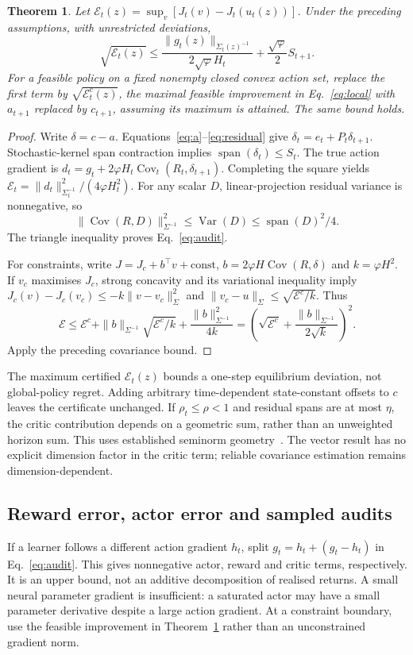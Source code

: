 \documentclass[sigconf,anonymous,review]{acmart}
\newcommand{\Var}{\operatorname{Var}}
\newcommand{\Cov}{\operatorname{Cov}}
\newcommand{\spn}{\operatorname{span}}
\newtheorem{theorem}{Theorem}
\begin{document}
\begin{theorem}\label{th:audit}
Let $\mathcal E_t(z)=\sup_v[J_t(v)-J_t(u_t(z))]$. Under the preceding assumptions, with unrestricted deviations,
\begin{equation}\label{eq:audit}
 \sqrt{\mathcal E_t(z)}\le
 \frac{\|g_t(z)\|_{\Sigma_t(z)^{-1}}}{2\sqrt\varphi H_t}
 +\frac{\sqrt\varphi}{2}S_{t+1}.
\end{equation}
For a feasible policy on a fixed nonempty closed convex action set, replace the first term by $\sqrt{\mathcal E_t^c(z)}$, the maximal feasible improvement in Eq.~\eqref{eq:local} with $a_{t+1}$ replaced by $c_{t+1}$, assuming its maximum is attained. The same bound holds.
\end{theorem}
\begin{proof}
Write $\delta=c-a $. Equations~\eqref{eq:a}--\eqref{eq:residual} give $\delta_t=e_t+P_t\delta_{t+1}$. Stochastic-kernel span contraction implies $\spn(\delta_t)\le S_t $. The true action gradient is $d_t=g_t+2\varphi H_t\Cov_t(R_t,\delta_{t+1})$. Completing the square yields
$\mathcal E_t=\|d_t\|_{\Sigma_t^{-1}}^2/(4\varphi H_t^2)$.
For any scalar $D $, linear-projection residual variance is nonnegative, so
\[
\|\Cov(R,D)\|_{\Sigma^{-1}}^2\le\Var(D)\le\spn(D)^2/4.
\]
The triangle inequality proves Eq.~\eqref{eq:audit}.

For constraints, write $J=J_c+b^\top v+\mathrm{const}$, $b=2\varphi H\Cov(R,\delta)$ and $k=\varphi H^2$. If $v_c $ maximises $J_c $, strong concavity and its variational inequality imply
$J_c(v)-J_c(v_c)\le-k\|v-v_c\|_\Sigma^2$ and
$\|v_c-u\|_\Sigma\le\sqrt{\mathcal E^c/k}$. Thus
\[
 \mathcal E\le\mathcal E^c+\|b\|_{\Sigma^{-1}}\sqrt{\mathcal E^c/k}
       +\frac{\|b\|_{\Sigma^{-1}}^2}{4k}
 =\left(\sqrt{\mathcal E^c}+\frac{\|b\|_{\Sigma^{-1}}}{2\sqrt k}\right)^2.
\]
Apply the preceding covariance bound.
\end{proof}
The maximum certified $\mathcal E_t(z)$ bounds a one-step equilibrium deviation, not global-policy regret. Adding arbitrary time-dependent state-constant offsets to $c $ leaves the certificate unchanged. If $\rho_t\le\rho<1$ and residual spans are at most $\eta $, the critic contribution depends on a geometric sum, rather than an unweighted horizon sum. This uses established seminorm geometry~\cite{chen2025seminorm}. The vector result has no explicit dimension factor in the critic term; reliable covariance estimation remains dimension-dependent.

\subsection{Reward error, actor error and sampled audits}
If a learner follows a different action gradient $h_t $, split $g_t=h_t+(g_t-h_t)$ in Eq.~\eqref{eq:audit}. This gives nonnegative actor, reward and critic terms, respectively. It is an upper bound, not an additive decomposition of realised returns. A small neural parameter gradient is insufficient: a saturated actor may have a small parameter derivative despite a large action gradient. At a constraint boundary, use the feasible improvement in Theorem~\ref{th:audit} rather than an unconstrained gradient norm.
\end{document}
